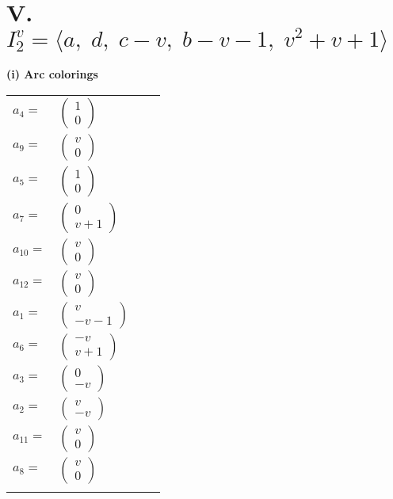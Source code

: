 \documentclass[1p]{elsarticle_modified}
\theoremstyle{definition}
\begin{document}
\centering \section*{V. $I^v_{2}= \langle a,\;d,\;c- v,\;b- v-1,\;v^2+v+1 \rangle$}
\flushleft \textbf{(i) Arc colorings}\\
\begin{tabular}{m{7pt} m{180pt} m{7pt} m{180pt} }
\flushright $a_{4}=$&$\begin{pmatrix}1\\0\end{pmatrix}$ \\
\flushright $a_{9}=$&$\begin{pmatrix}v\\0\end{pmatrix}$ \\
\flushright $a_{5}=$&$\begin{pmatrix}1\\0\end{pmatrix}$ \\
\flushright $a_{7}=$&$\begin{pmatrix}0\\v+1\end{pmatrix}$ \\
\flushright $a_{10}=$&$\begin{pmatrix}v\\0\end{pmatrix}$ \\
\flushright $a_{12}=$&$\begin{pmatrix}v\\0\end{pmatrix}$ \\
\flushright $a_{1}=$&$\begin{pmatrix}v\\- v-1\end{pmatrix}$ \\
\flushright $a_{6}=$&$\begin{pmatrix}- v\\v+1\end{pmatrix}$ \\
\flushright $a_{3}=$&$\begin{pmatrix}0\\- v\end{pmatrix}$ \\
\flushright $a_{2}=$&$\begin{pmatrix}v\\- v\end{pmatrix}$ \\
\flushright $a_{11}=$&$\begin{pmatrix}v\\0\end{pmatrix}$ \\
\flushright $a_{8}=$&$\begin{pmatrix}v\\0\end{pmatrix}$\\&\end{tabular}
\end{document}
